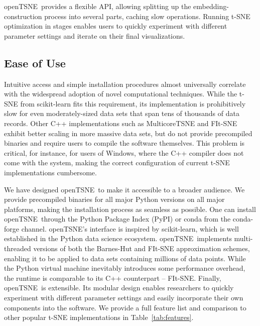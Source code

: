 \documentclass[twocolumn]{article}
\newcommand{\opentsne}{\textsf{openTSNE}}
\begin{document}
\opentsne\ provides a flexible API, allowing splitting up the
embedding-construction process into several parts, caching slow operations.
Running t-SNE optimization in stages enables users to quickly experiment with
different parameter settings and iterate on their final visualizations.

\subsection*{Ease of Use}

Intuitive access and simple installation procedures almost universally correlate
with the widespread adoption of novel computational techniques. While the t-SNE
from \textsf{scikit-learn} fits this requirement, its implementation is
prohibitively slow for even moderately-sized data sets that span tens of
thousands of data records. Other C++ implementations such as
\textsf{MulticoreTSNE} and \textsf{FIt-SNE} exhibit better scaling in more
massive data sets, but do not provide precompiled binaries and require users to
compile the software themselves. This problem is critical, for instance, for
users of Windows, where the C++ compiler does not come with the system, making
the correct configuration of current t-SNE implementations cumbersome.

We have designed \opentsne\ to make it accessible to a broader audience. We
provide precompiled binaries for all major Python versions on all major
platforms, making the installation process as seamless as possible. One can
install \opentsne\ through the Python Package Index (\textsf{PyPI}) or \textsf{conda} from the
\textsf{conda-forge} channel. \opentsne's interface is inspired by \textsf{scikit-learn},
which is well established in the Python data science ecosystem. \opentsne\
implements multi-threaded versions of both the Barnes-Hut and FIt-SNE
approximation schemes, enabling it to be applied to data sets containing millions of data
points. While the Python virtual machine inevitably introduces some performance overhead,
the runtime is comparable to its C++ counterpart -- \textsf{FIt-SNE}. Finally,
\opentsne\ is extensible. Its modular design enables researchers to quickly
experiment with different parameter settings and easily incorporate their own components into
the software. We provide a full feature list and comparison to other popular
t-SNE implementations in Table~\ref{tab:features}.
\end{document}
